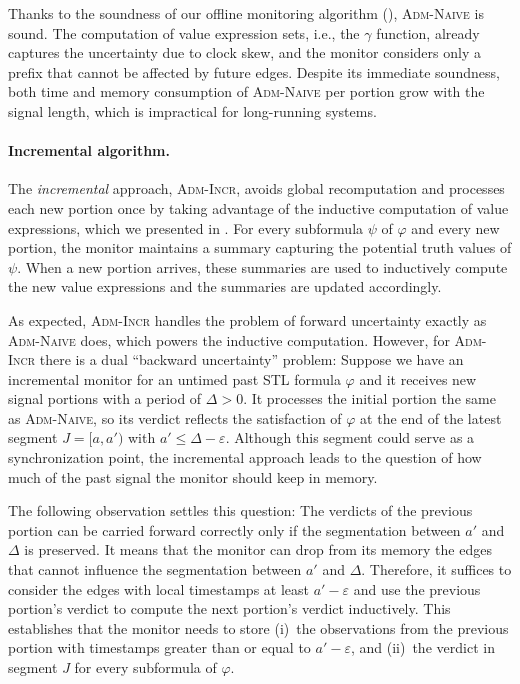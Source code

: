 \documentclass[iicol,lineno]{sn-jnl}
\renewcommand{\cref}{\Cref}
\newcommand{\?}{\text{?}}
\begin{document}
	Thanks to the soundness of our offline monitoring algorithm (\cref{cl:algo}), \textsc{Adm-Naive} is sound.
	The computation of value expression sets, i.e., the $\gamma$ function, already captures the uncertainty due to clock skew, and the monitor considers only a prefix that cannot be affected by future edges.
	Despite its immediate soundness, both time and memory consumption of \textsc{Adm-Naive} per portion grow with the signal length, which is impractical for long-running systems.
	
	\paragraph*{Incremental algorithm.}
	The \emph{incremental} approach, \textsc{Adm-Incr}, avoids global recomputation and processes each new portion once by taking advantage of the inductive computation of value expressions, which we presented in \cref{sec:offline}.
	For every subformula $\psi$ of $\varphi$ and every new portion, the monitor maintains a summary capturing the potential truth values of $\psi$.
	When a new portion arrives, these summaries are used to inductively compute the new value expressions and the summaries are updated accordingly.
	
	As expected, \textsc{Adm-Incr} handles the problem of forward uncertainty exactly as \textsc{Adm-Naive} does, which powers the inductive computation.
	However, for \textsc{Adm-Incr} there is a dual ``backward uncertainty'' problem:
	Suppose we have an incremental monitor for an untimed past STL formula $\varphi$ and it receives new signal portions with a period of $\Delta > 0$.
	It processes the initial portion the same as \textsc{Adm-Naive}, so its verdict reflects the satisfaction of $\varphi$ at the end of the latest segment $J = [a, a')$ with $a' \leq \Delta - \varepsilon$.
	Although this segment could serve as a synchronization point, the incremental approach leads to the question of how much of the past signal the monitor should keep in memory.
	
	The following observation settles this question:
	The verdicts of the previous portion can be carried forward correctly only if the segmentation between $a'$ and $\Delta$ is preserved.
	It means that the monitor can drop from its memory the edges that cannot influence the segmentation between $a'$ and $\Delta$.
	Therefore, it suffices to consider the edges with local timestamps at least $a' - \varepsilon$ and use the previous portion's verdict to compute the next portion's verdict inductively.
	This establishes that the monitor needs to store (i)~the observations from the previous portion with timestamps greater than or equal to $a' - \varepsilon$, and (ii)~the verdict in segment $J$ for every subformula of $\varphi$.
	
\end{document}
